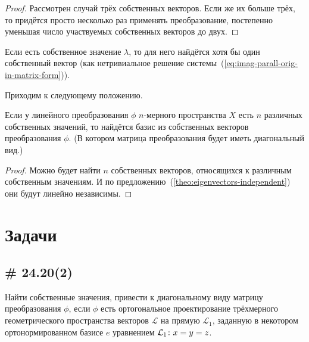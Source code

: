 \documentclass[a4paper,12pt]{article}
\newcommand{\proofindent}{\hspace*{\fill}\par\vspace{0.5em}\noindent}
\begin{document}
\begin{proof}
    Рассмотрен случай трёх собственных векторов.
    Если же их больше трёх, то придётся просто несколько раз применять преобразование, постепенно уменьшая число участвуемых собственных векторов до двух.
  \end{proof}
  
  Если есть собственное значение $\lambda$, то для него найдётся хотя бы один собственный вектор (как нетривиальное решение системы~(\ref{eq:imag-parall-orig-in-matrix-form})).
  
  Приходим к следующему положению.
  
  \begin{theorem}
    \proofindent
    Если у линейного преобразования $\phi$ $n$-мерного пространства $X$ есть $n$ различных собственных значений, то найдётся базис из собственных векторов преобразования $\phi$.
    (В котором матрица преобразования будет иметь диагональный вид.)
  \end{theorem}
  
  \begin{proof}
    Можно будет найти $n$ собственных векторов, относящихся к различным собственным значениям.
    И по предложению~(\ref{theo:eigenvectors-independent}) они будут линейно независимы.
  \end{proof}
  
  
  \section{Задачи}
  
  \subsection{\# 24.20(2)}
  
  Найти собственные значения, привести к диагональному виду матрицу преобразования $\phi$, если $\phi$ есть ортогональное проектирование трёхмерного геометрического пространства векторов $\mathcal L$ на прямую $\mathcal L_1$, заданную в некотором ортонормированном базисе $e$ уравнением $\mathcal L_1\colon x\hm= y \hm= z$.
  
\end{document}
